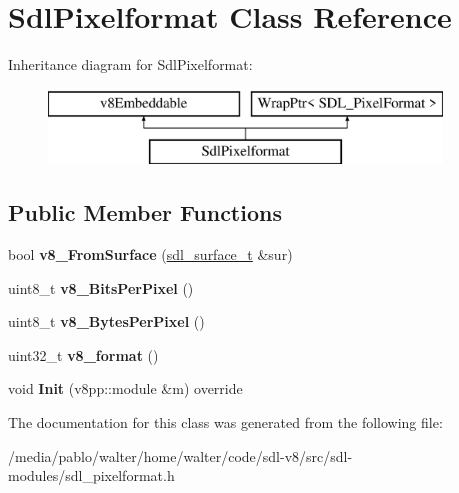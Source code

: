 \hypertarget{classSdlPixelformat}{}\section{Sdl\+Pixelformat Class Reference}
\label{classSdlPixelformat}
Inheritance diagram for Sdl\+Pixelformat\+:\begin{figure}[H]
\begin{center}
\leavevmode
\includegraphics[height=2.000000cm]{classSdlPixelformat}
\end{center}
\end{figure}
\subsection*{Public Member Functions}
\begin{DoxyCompactItemize}
\item 
\mbox{\label{classSdlPixelformat_ace2f306b797d1f193e1a1cbbf3fe63da}} 
bool {\bfseries v8\+\_\+\+From\+Surface} (\mbox{\hyperlink{classWrapPtr}{sdl\+\_\+surface\+\_\+t}} \&sur)
\item 
\mbox{\label{classSdlPixelformat_a1a1883b5e4d170d9b2a74d45a6d3983c}} 
uint8\+\_\+t {\bfseries v8\+\_\+\+Bits\+Per\+Pixel} ()
\item 
\mbox{\label{classSdlPixelformat_a09dcedafc42e60bdbaa6615452f514bb}} 
uint8\+\_\+t {\bfseries v8\+\_\+\+Bytes\+Per\+Pixel} ()
\item 
\mbox{\label{classSdlPixelformat_a776c939974688105b5aa390dcbcc887f}} 
uint32\+\_\+t {\bfseries v8\+\_\+format} ()
\item 
\mbox{\label{classSdlPixelformat_a4113abd42de25a514a288bb1b5ff196f}} 
void {\bfseries Init} (v8pp\+::module \&m) override
\end{DoxyCompactItemize}


The documentation for this class was generated from the following file\+:\begin{DoxyCompactItemize}
\item 
/media/pablo/walter/home/walter/code/sdl-\/v8/src/sdl-\/modules/sdl\+\_\+pixelformat.\+h\end{DoxyCompactItemize}
